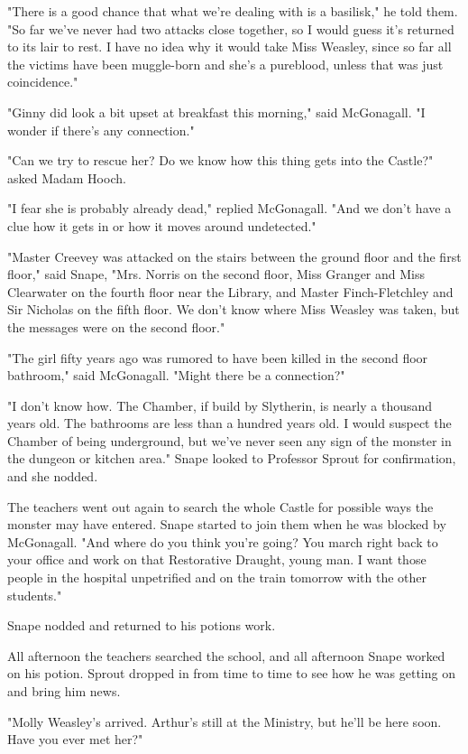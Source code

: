 \documentclass[a4paper,11pt]{article}
\begin{document}
"There is a good chance that what we're dealing with is a basilisk," he told them. "So far we've never had two attacks close together, so I would guess it's returned to its lair to rest. I have no idea why it would take Miss Weasley, since so far all the victims have been muggle-born and she's a pureblood, unless that was just coincidence."

"Ginny did look a bit upset at breakfast this morning," said McGonagall. "I wonder if there's any connection."

"Can we try to rescue her? Do we know how this thing gets into the Castle?" asked Madam Hooch.

"I fear she is probably already dead," replied McGonagall. "And we don't have a clue how it gets in or how it moves around undetected."

"Master Creevey was attacked on the stairs between the ground floor and the first floor," said Snape, "Mrs. Norris on the second floor, Miss Granger and Miss Clearwater on the fourth floor near the Library, and Master Finch-Fletchley and Sir Nicholas on the fifth floor. We don't know where Miss Weasley was taken, but the messages were on the second floor."

"The girl fifty years ago was rumored to have been killed in the second floor bathroom," said McGonagall. "Might there be a connection?"

"I don't know how. The Chamber, if build by Slytherin, is nearly a thousand years old. The bathrooms are less than a hundred years old. I would suspect the Chamber of being underground, but we've never seen any sign of the monster in the dungeon or kitchen area." Snape looked to Professor Sprout for confirmation, and she nodded.

The teachers went out again to search the whole Castle for possible ways the monster may have entered. Snape started to join them when he was blocked by McGonagall. "And where do you think you're going? You march right back to your office and work on that Restorative Draught, young man. I want those people in the hospital unpetrified and on the train tomorrow with the other students."

Snape nodded and returned to his potions work.

All afternoon the teachers searched the school, and all afternoon Snape worked on his potion. Sprout dropped in from time to time to see how he was getting on and bring him news.

"Molly Weasley's arrived. Arthur's still at the Ministry, but he'll be here soon. Have you ever met her?"
\end{document}
